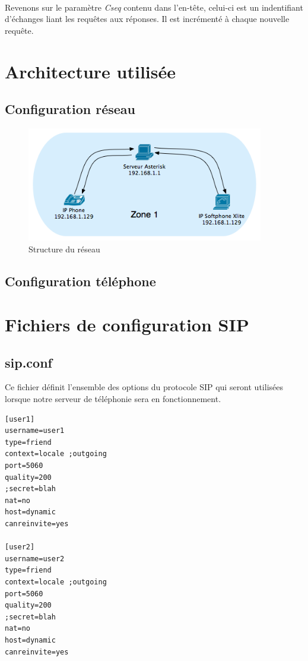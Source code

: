 \documentclass[12pt,a4paper,notitlepage]{article}
\begin{document}
\paragraph{} Revenons sur le paramètre \textit{Cseq} contenu dans l'en-tête, celui-ci est un indentifiant d'échanges liant les requêtes aux réponses. Il est incrémenté à chaque nouvelle requête.

\section{Architecture utilisée}
\subsection{Configuration réseau}
\begin{figure}[!h]
\begin{center}
\includegraphics[height=5cm]{structure_reseau}
\caption{Structure du réseau}
\label{fig:da}
\end{center}
\end{figure}

\subsection{Configuration téléphone}
\clearpage
\section{Fichiers de configuration SIP}
\subsection{sip.conf}
Ce fichier définit l'ensemble des options du protocole SIP qui seront utilisées lorsque notre serveur de téléphonie sera en fonctionnement. \\
\begin{lstlisting}[title=sip.conf v1]
[user1]
username=user1
type=friend
context=locale ;outgoing
port=5060
quality=200
;secret=blah
nat=no
host=dynamic
canreinvite=yes

[user2]
username=user2
type=friend
context=locale ;outgoing
port=5060
quality=200
;secret=blah
nat=no
host=dynamic
canreinvite=yes
\end{lstlisting}
\end{document}
